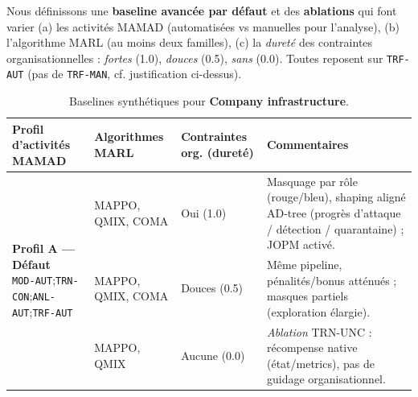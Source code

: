 Nous définissons une \textbf{baseline avancée par défaut} et des \textbf{ablations} qui font varier (a) les activités MAMAD (automatisées vs manuelles pour l’analyse), (b) l’algorithme MARL (au moins deux familles), (c) la \emph{dureté} des contraintes organisationnelles : \emph{fortes} (1.0), \emph{douces} (0.5), \emph{sans} (0.0). Toutes reposent sur \texttt{TRF-AUT} (pas de \texttt{TRF-MAN}, cf. justification ci-dessus).

\begin{table}[h!]
  \centering
  \caption{Baselines synthétiques pour \textbf{Company infrastructure}.}
  \label{tab:baselines_company}
  \renewcommand{\arraystretch}{1}
  \tiny
  \begin{tabularx}{\textwidth}{p{3.8cm}p{2.6cm}p{2.8cm}p{4.6cm}}
    \toprule
    \textbf{Profil d'activités MAMAD} & \textbf{Algorithmes MARL} & \textbf{Contraintes org. (dureté)} & \textbf{Commentaires}                                                                                                                                                          \\
    \midrule
    \multirow{3}{*}{\parbox{3.8cm}{\textbf{Profil A — Défaut}                                                                                                                                                                                                                           \\
        \texttt{MOD-AUT};\;\texttt{TRN-CON};\;\texttt{ANL-AUT};\;\texttt{TRF-AUT}}}
                                      & MAPPO, QMIX, COMA         & Oui (1.0)                          & Masquage par rôle (rouge/bleu), shaping aligné AD-tree (progrès d’attaque / détection / quarantaine) ; JOPM activé.                                                            \\
                                      & MAPPO, QMIX, COMA         & Douces (0.5)                       & Même pipeline, pénalités/bonus atténués ; masques partiels (exploration élargie).                                                                                              \\
                                      & MAPPO, QMIX               & Aucune (0.0)                       & \textit{Ablation} TRN-UNC : récompense native (état/metrics), pas de guidage organisationnel.                                                                                  \\
    \midrule

\end{tabularx}
\end{table}
